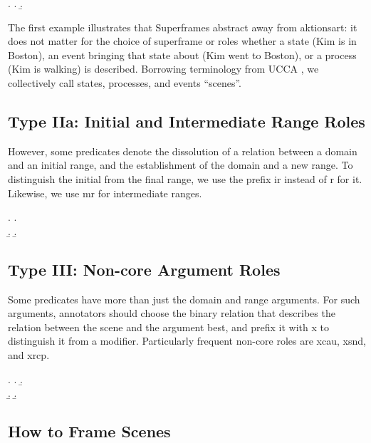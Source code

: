 \documentclass[a4paper]{article}
\begin{document}
\ex. \a. 
     \b. 

The first example illustrates that Superframes abstract away from aktionsart: it does not matter for the choice of superframe or roles whether a state (Kim is in Boston), an event bringing that state about (Kim went to Boston), or a process (Kim is walking) is described. Borrowing terminology from UCCA \citep{abend-rappoport-2013-universal}, we collectively call states, processes, and events ``scenes''.

\subsection{Type IIa: Initial and Intermediate Range Roles}

However, some predicates denote the dissolution of a relation between a domain and an initial range, and the establishment of the domain and a new range. To distinguish the initial from the final range, we use the prefix \textsf{ir} instead of \textsf{r} for it. Likewise, we use \textsf{mr} for intermediate ranges.

\ex. \a. \\
     \b. 
     \b. 

\subsection{Type III: Non-core Argument Roles}

Some predicates have more than just the domain and range arguments. For such arguments, annotators should choose the binary relation that describes the relation between the scene and the argument best, and prefix it with \textsf{x} to distinguish it from a modifier. Particularly frequent non-core roles are \textsf{xcau}, \textsf{xsnd}, and \textsf{xrcp}.

\ex. \a. 
     \b. \\
     \b. 
     \b. 

\subsection{How to Frame Scenes}
\end{document}
